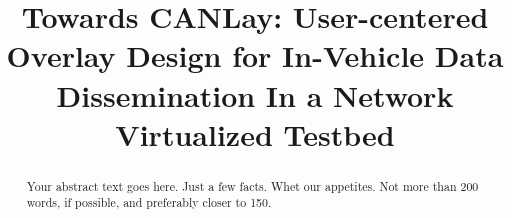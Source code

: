 \documentclass[letterpaper,twocolumn,12pt]{article}
\begin{document}

\date{}

\title{\Large \bf Towards CANLay: User-centered Overlay Design for In-Vehicle Data Dissemination In a Network Virtualized Testbed}


\maketitle

\begin{abstract}
Your abstract text goes here. Just a few facts. Whet our appetites.
Not more than 200 words, if possible, and preferably closer to 150.
\end{abstract}
\end{document}

